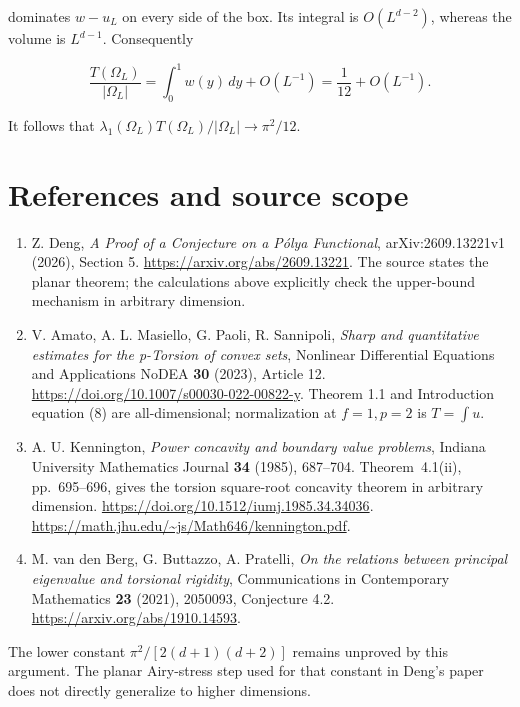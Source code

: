 \documentclass[11pt,a4paper]{article}
\providecommand{\tightlist}{\setlength{\itemsep}{0pt}\setlength{\parskip}{0pt}}
\begin{document}
dominates \(w-u_L\) on every side of the box. Its integral is
\(O(L^{d-2})\), whereas the volume is \(L^{d-1}\). Consequently

\[
 \frac{T(\Omega_L)}{|\Omega_L|}
 =\int_0^1w(y)\,dy+O(L^{-1})
 =\frac1{12}+O(L^{-1}).
\]

It follows that
\(\lambda _1(\Omega _L)T(\Omega _L)/|\Omega _L| \to \pi ^2/12\).

\hypertarget{1028-references-and-source-scope}{%
\section{References and source
scope}\label{1028-references-and-source-scope}}

\begin{enumerate}
\def\labelenumi{\arabic{enumi}.}
\tightlist
\item
  Z. Deng, \emph{A Proof of a Conjecture on a Pólya Functional},
  arXiv:2609.13221v1 (2026), Section 5.
  \url{https://arxiv.org/abs/2609.13221}. The source states the planar
  theorem; the calculations above explicitly check the upper-bound
  mechanism in arbitrary dimension.
\item
  V. Amato, A. L. Masiello, G. Paoli, R. Sannipoli, \emph{Sharp and
  quantitative estimates for the p-Torsion of convex sets}, Nonlinear
  Differential Equations and Applications NoDEA \textbf{30} (2023),
  Article 12. \url{https://doi.org/10.1007/s00030-022-00822-y}. Theorem
  1.1 and Introduction equation (8) are all-dimensional; normalization
  at \(f=1,p=2\) is \(T=\int u\).
\item
  A. U. Kennington, \emph{Power concavity and boundary value problems},
  Indiana University Mathematics Journal \textbf{34} (1985), 687--704.
  Theorem~4.1(ii), pp.~695--696, gives the torsion square-root
  concavity theorem in arbitrary dimension.
  \url{https://doi.org/10.1512/iumj.1985.34.34036}.
  \url{https://math.jhu.edu/~js/Math646/kennington.pdf}.
\item
  M. van den Berg, G. Buttazzo, A. Pratelli, \emph{On the relations between
  principal eigenvalue and torsional rigidity}, Communications in
  Contemporary Mathematics \textbf{23} (2021), 2050093, Conjecture 4.2.
  \url{https://arxiv.org/abs/1910.14593}.
\end{enumerate}

The lower constant \(\pi ^2/[2(d+1)(d+2)]\) remains unproved by this
argument. The planar Airy-stress step used for that constant in Deng's
paper does not directly generalize to higher dimensions.
\appendix
\end{document}
